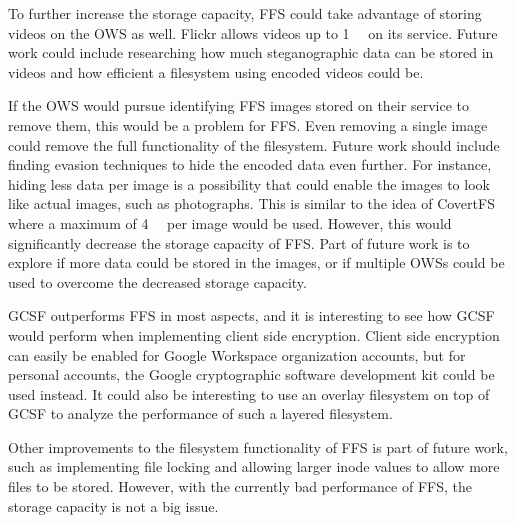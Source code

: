 To further increase the storage capacity, \gls{FFS} could take advantage of storing videos on the \gls{OWS} as well. Flickr allows videos up to \SI[per-mode = symbol]{1}{\giga\byte} on its service. Future work could include researching how much steganographic data can be stored in videos and how efficient a filesystem using encoded videos could be.

If the \gls{OWS} would pursue identifying \gls{FFS} images stored on their service to remove them, this would be a problem for \gls{FFS}. Even removing a single image could remove the full functionality of the filesystem. Future work should include finding evasion techniques to hide the encoded data even further. For instance, hiding less data per image is a possibility that could enable the images to look like actual images, such as photographs. This is similar to the idea of CovertFS\,\cite{baliga2007web} where a maximum of \SI[per-mode = symbol]{4}{\kilo\byte} per image would be used. However, this would significantly decrease the storage capacity of \gls{FFS}. Part of future work is to explore if more data could be stored in the images, or if multiple \glspl{OWS} could be used to overcome the decreased storage capacity. 

\gls{GCSF} outperforms \gls{FFS} in most aspects, and it is interesting to see how \gls{GCSF} would perform when implementing client side encryption. Client side encryption can easily be enabled for Google Workspace organization accounts, but for personal accounts, the Google cryptographic software development kit could be used instead. It could also be interesting to use an overlay filesystem on top of \gls{GCSF} to analyze the performance of such a layered filesystem.

Other improvements to the filesystem functionality of \gls{FFS} is part of future work, such as implementing file locking and allowing larger inode values to allow more files to be stored. However, with the currently bad performance of \gls{FFS}, the storage capacity is not a big issue.

%
%